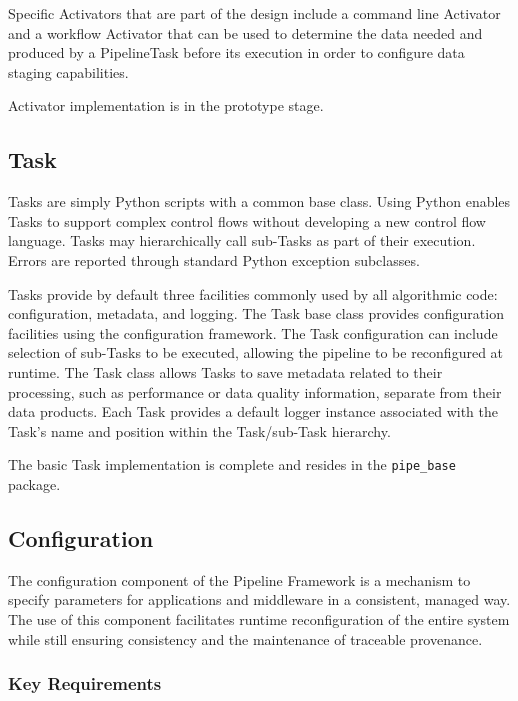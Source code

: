 \documentclass[DM,lsstdraft,toc]{lsstdoc}
\begin{document}
Specific Activators that are part of the design include a command line
Activator and a workflow Activator that can be used to determine the data
needed and produced by a PipelineTask before its execution in order to configure
data staging capabilities.

Activator implementation is in the prototype stage.

\subsection{Task}\label{task}

Tasks are simply Python scripts with a common base class. Using Python enables
Tasks to support complex control flows without developing a new control flow
language. Tasks may hierarchically call sub-Tasks as part of their execution.
Errors are reported through standard Python exception subclasses.

Tasks provide by default three facilities commonly used by all algorithmic
code: configuration, metadata, and logging.  The Task base class provides
configuration facilities using the configuration framework. The Task
configuration can include selection of sub-Tasks to be executed, allowing the
pipeline to be reconfigured at runtime.  The Task class allows Tasks to save
metadata related to their processing, such as performance or data quality
information, separate from their data products.  Each Task provides a default
logger instance associated with the Task's name and position within the
Task/sub-Task hierarchy.

The basic Task implementation is complete and resides in the
\texttt{pipe\_base} package.

\subsection{Configuration}\label{configuration}

The configuration component of the Pipeline Framework is a mechanism to
specify parameters for applications and middleware in a consistent,
managed way. The use of this component facilitates runtime
reconfiguration of the entire system while still ensuring consistency
and the maintenance of traceable provenance.

\subsubsection{Key Requirements}\label{configuration-reqs}
\end{document}
